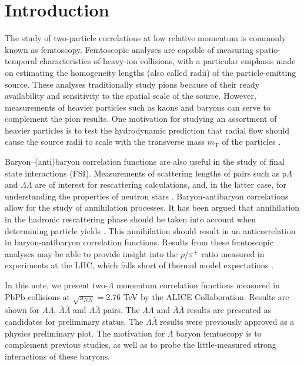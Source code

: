 %


\providecommand{\abs}[1]{\left\lvert#1\right\rvert}
\tableofcontents
\listoffigures
\pagebreak
\section{Introduction}

The study of two-particle correlations at low relative momentum is commonly known as femtoscopy.  Femtoscopic analyses are capable of measuring spatio-temporal characteristics of heavy-ion collisions, with a particular emphasis made on estimating the homogeneity lengths (also called radii) of the particle-emitting source.  These analyses traditionally study pions \cite{Goldhaber:1960sf,Aamodt:2011mr} because of their ready availability and sensitivity to the spatial scale of the source.  However, measurements of heavier particles such as kaons \cite{Abelev:2012ms} and baryons \cite{Gos:2007cj} can serve to complement the pion results.  One motivation for studying an assortment of heavier particles is to test the hydrodynamic prediction that radial flow should cause the source radii to scale with the transverse mass $m_{\mathrm{T}}$ of the particles \cite{Csorgo:1995bi,Lisa:2005dd}.

Baryon--(anti)baryon correlation functions are also useful in the study of final state interactions (FSI).  Measurements of scattering lengths of pairs such as p$\Lambda$ and $\Lambda\Lambda$ are of interest for rescattering calculations, and, in the latter case, for understanding the properties of neutron stars \cite{SchaffnerBielich:2008kb,Wang:2010gr}.  Baryon-antibaryon correlations allow for the study of annihilation processes.  It has been argued that annihilation in the hadronic rescattering phase should be taken into account when determining particle yields \cite{Werner:2012xh,Karpenko:2012yf,Steinheimer:2012rd}.  This annihilation should result in an anticorrelation in baryon-antibaryon correlation functions.  Results from these femtoscopic analyses may be able to provide insight into the $p/\pi^+$ ratio measured in experiments at the LHC, which falls short of thermal model expectations \cite{Preghenella:2012eu}. 

In this note, we present two-$\Lambda$ momentum correlation functions measured in PbPb collisions at $\sqrt{s_{NN}}=2.76$ TeV by the ALICE Collaboration.  Results are shown for $\Lambda\Lambda$, $\bar{\Lambda}\bar{\Lambda}$ and $\Lambda\bar{\Lambda}$ pairs. The $\Lambda\Lambda$ and $\bar{\Lambda}\bar{\Lambda}$ results are presented as candidates for preliminary status. The $\Lambda\bar{\Lambda}$ results were previously approved as a physics preliminary plot.  The motivation for $\Lambda$ baryon femtoscopy is to complement previous studies, as well as to probe the little-measured strong interactions of these baryons.


